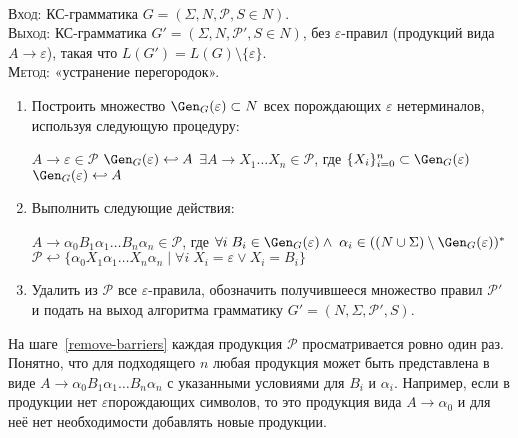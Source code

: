 \begin{NumAlgo}\label{algo-del-eps}
\nspace\\
\textsc{Вход}: КС-грамматика $G=(\Sigma, N, \mathcal P, S \in N)$.\\ 
\textsc{Выход}: КС-грамматика $G'=(\Sigma, N, \mathcal P', S \in N)$, без
$\varepsilon$-правил (продукций вида $A \to \varepsilon$), такая что
$L(G')=L(G) \setminus \{ \varepsilon \}$.\\
\textsc{Метод}: «устранение перегородок».
\begin{enumerate}
  \item Построить множество $\Gen_G(\varepsilon) \subset N$ всех порождающих
  $\varepsilon$ нетерминалов, используя следующую процедуру:
  \begin{codebox}
  \li   \For $A \to \varepsilon \in \mathcal P$
  \zi   \Do      
            $\Gen_G(\varepsilon) \hookleftarrow A$
        \End
  \li   \While $\exists A \to X_1 \ldots X_n \in \mathcal P$,
        где $\{ X_i \}_{i=0}^n \subset \Gen_G(\varepsilon)$
  \zi       \Do
            $\Gen_G(\varepsilon) \hookleftarrow A$
            \End
        \End
  \end{codebox}
  \item\label{remove-barriers} Выполнить следующие действия:
  \begin{codebox}
  \zi \For $A \to \alpha_0 B_1 \alpha_1 \ldots B_n \alpha_n \in \mathcal P$, где
  $\forall i \; B_i \in \Gen_G(\varepsilon) \wedge \; 
  \alpha_i \in ((N \cup \Sigma) \setminus \Gen_G(\varepsilon))^*$
  \zi   \Do
        $\mathcal P \hookleftarrow 
            \{ \alpha_0 X_1 \alpha_1 \ldots X_n \alpha_n \mid 
            \forall i \; X_i = \varepsilon \vee X_i = B_i \}$
        \End
  \end{codebox}
  \item Удалить из $\mathcal P$ все $\varepsilon$-правила, обозначить
  получившееся множество правил $\mathcal P'$ и подать на выход алгоритма
  грамматику $G' = (N, \Sigma, \mathcal P', S)$.
\end{enumerate}
\begin{Remark}
На шаге~\ref{remove-barriers} каждая продукция $\mathcal P$ просматривается ровно
один раз. Понятно, что для подходящего $n$ любая продукция может быть
представлена в виде $A \to \alpha_0 B_1 \alpha_1 \ldots B_n \alpha_n$ с
указанными условиями для $B_i$ и $\alpha_i$. Например, если в продукции нет
$\varepsilon$\nbdash{}порождающих символов, то это продукция вида $A \to
\alpha_0$ и для неё нет необходимости добавлять новые продукции.


\end{Remark}
\end{NumAlgo}
